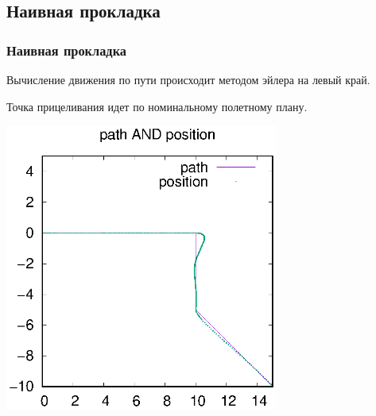 \documentclass[10pt,t]{beamer}
\begin{document}
\subsection[Наивная прокладка]{Наивная прокладка}
\begin{frame}
\frametitle{Наивная прокладка}
\small
Вычисление движения по пути происходит методом эйлера на левый край.

Точка прицеливания идет по номинальному полетному плану.

\pause

\centering

\includegraphics[width=90mm]{default_path_not_procladka.eps}


\end{frame}
\end{document}
